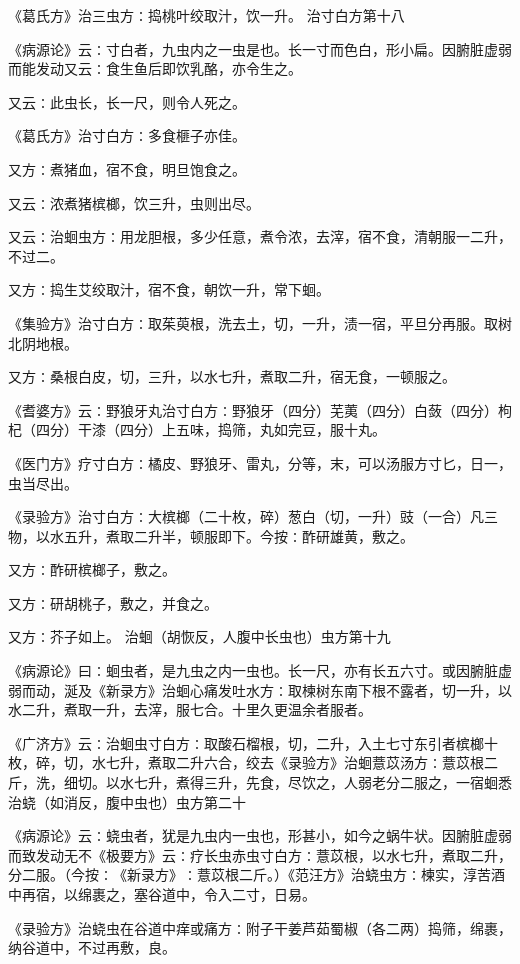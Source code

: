 \documentclass[a4paper,12pt,UTF8,twoside]{ctexbook}
\begin{document}
《葛氏方》治三虫方∶捣桃叶绞取汁，饮一升。
治寸白方第十八

《病源论》云∶寸白者，九虫内之一虫是也。长一寸而色白，形小扁。因腑脏虚弱而能发动又云∶食生鱼后即饮乳酪，亦令生之。

又云∶此虫长，长一尺，则令人死之。

《葛氏方》治寸白方∶多食榧子亦佳。

又方∶煮猪血，宿不食，明旦饱食之。

又云∶浓煮猪槟榔，饮三升，虫则出尽。

又云∶治蛔虫方∶用龙胆根，多少任意，煮令浓，去滓，宿不食，清朝服一二升，不过二。

又方∶捣生艾绞取汁，宿不食，朝饮一升，常下蛔。

《集验方》治寸白方∶取茱萸根，洗去土，切，一升，渍一宿，平旦分再服。取树北阴地根。

又方∶桑根白皮，切，三升，以水七升，煮取二升，宿无食，一顿服之。

《耆婆方》云∶野狼牙丸治寸白方∶野狼牙（四分）芜荑（四分）白蔹（四分）枸杞（四分）干漆（四分）上五味，捣筛，丸如完豆，服十丸。

《医门方》疗寸白方∶橘皮、野狼牙、雷丸，分等，末，可以汤服方寸匕，日一，虫当尽出。

《录验方》治寸白方∶大槟榔（二十枚，碎）葱白（切，一升）豉（一合）凡三物，以水五升，煮取二升半，顿服即下。今按∶酢研雄黄，敷之。

又方∶酢研槟榔子，敷之。

又方∶研胡桃子，敷之，并食之。

又方∶芥子如上。
治蛔（胡恢反，人腹中长虫也）虫方第十九

《病源论》曰∶蛔虫者，是九虫之内一虫也。长一尺，亦有长五六寸。或因腑脏虚弱而动，涎及《新录方》治蛔心痛发吐水方∶取楝树东南下根不露者，切一升，以水二升，煮取一升，去滓，服七合。十里久更温余者服者。

《广济方》云∶治蛔虫寸白方∶取酸石榴根，切，二升，入土七寸东引者槟榔十枚，碎，切，水七升，煮取二升六合，绞去《录验方》治蛔薏苡汤方∶薏苡根二斤，洗，细切。以水七升，煮得三升，先食，尽饮之，人弱老分二服之，一宿蛔悉
治蛲（如消反，腹中虫也）虫方第二十

《病源论》云∶蛲虫者，犹是九虫内一虫也，形甚小，如今之蜗牛状。因腑脏虚弱而致发动无不《极要方》云∶疗长虫赤虫寸白方∶薏苡根，以水七升，煮取二升，分二服。（今按∶《新录方》∶薏苡根二斤。）《范汪方》治蛲虫方∶楝实，淳苦酒中再宿，以绵裹之，塞谷道中，令入二寸，日易。

《录验方》治蛲虫在谷道中痒或痛方∶附子干姜芦茹蜀椒（各二两）捣筛，绵裹，纳谷道中，不过再敷，良。
\end{document}
